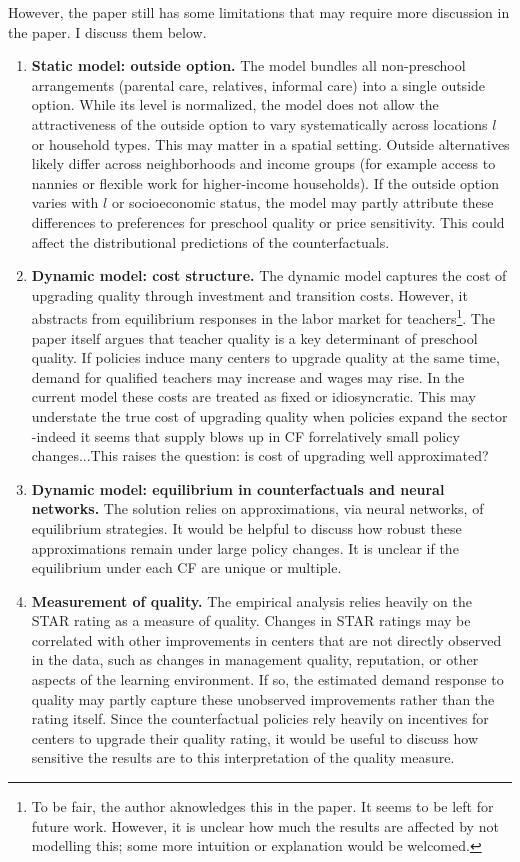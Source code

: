\documentclass{article}
\begin{document}
However, the paper still has some limitations that may require more discussion in the paper. I discuss them below.

\begin{enumerate}

\item \textbf{Static model: outside option.}  
The model bundles all non-preschool arrangements (parental care, relatives, informal care) into a single outside option. While its level is normalized, the model does not allow the attractiveness of the outside option to vary systematically across locations $l$ or household types. This may matter in a spatial setting. Outside alternatives likely differ across neighborhoods and income groups (for example access to nannies or flexible work for higher-income households). If the outside option varies with $l$ or socioeconomic status, the model may partly attribute these differences to preferences for preschool quality or price sensitivity. This could affect the distributional predictions of the counterfactuals.

\item \textbf{Dynamic model: cost structure.}  
The dynamic model captures the cost of upgrading quality through investment and transition costs. However, it abstracts from equilibrium responses in the labor market for teachers\footnote{To be fair, the author aknowledges this in the paper. It seems to be left for future work. However, it is unclear how much the results are affected by not modelling this; some more intuition or explanation would be welcomed.}. The paper itself argues that teacher quality is a key determinant of preschool quality. If policies induce many centers to upgrade quality at the same time, demand for qualified teachers may increase and wages may rise. In the current model these costs are treated as fixed or idiosyncratic. This may understate the true cost of upgrading quality when policies expand the sector -indeed it seems that supply blows up in CF forrelatively small policy changes...This raises the question: is cost of upgrading well approximated?

\item \textbf{Dynamic model: equilibrium in counterfactuals and neural networks.}  The solution relies on approximations, via neural networks, of equilibrium strategies. It would be helpful to discuss how robust these approximations remain under large policy changes. It is unclear if the equilibrium under each CF are unique or multiple.

\item \textbf{Measurement of quality.}  
The empirical analysis relies heavily on the STAR rating as a measure of quality. Changes in STAR ratings may be correlated with other improvements in centers that are not directly observed in the data, such as changes in management quality, reputation, or other aspects of the learning environment. If so, the estimated demand response to quality may partly capture these unobserved improvements rather than the rating itself. Since the counterfactual policies rely heavily on incentives for centers to upgrade their quality rating, it would be useful to discuss how sensitive the results are to this interpretation of the quality measure.



\end{enumerate}
\end{document}

